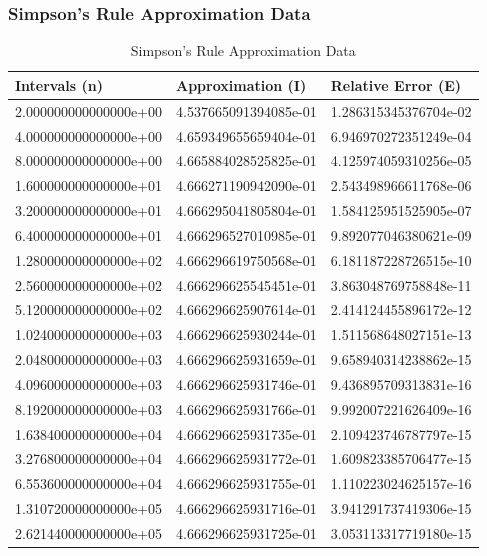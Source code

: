 \documentclass[pdf,color]{UoBnote}
\begin{document}
		\subsubsection{Simpson's Rule Approximation Data}
			\begin{table}[H]
			\centering
			\caption{Simpson's Rule Approximation Data}
    \begin{tabular}{|l|l|l|}
        \hline
		Intervals (n) & Approximation (I) & Relative Error (E)\\
		\hline
        2.000000000000000e+00 & 4.537665091394085e-01 & 1.286315345376704e-02 \\ 
        4.000000000000000e+00 & 4.659349655659404e-01 & 6.946970272351249e-04 \\ 
        8.000000000000000e+00 & 4.665884028525825e-01 & 4.125974059310256e-05 \\ 
        1.600000000000000e+01 & 4.666271190942090e-01 & 2.543498966611768e-06 \\ 
        3.200000000000000e+01 & 4.666295041805804e-01 & 1.584125951525905e-07 \\ 
        6.400000000000000e+01 & 4.666296527010985e-01 & 9.892077046380621e-09 \\ 
        1.280000000000000e+02 & 4.666296619750568e-01 & 6.181187228726515e-10 \\ 
        2.560000000000000e+02 & 4.666296625545451e-01 & 3.863048769758848e-11 \\ 
        5.120000000000000e+02 & 4.666296625907614e-01 & 2.414124455896172e-12 \\ 
        1.024000000000000e+03 & 4.666296625930244e-01 & 1.511568648027151e-13 \\ 
        2.048000000000000e+03 & 4.666296625931659e-01 & 9.658940314238862e-15 \\ 
        4.096000000000000e+03 & 4.666296625931746e-01 & 9.436895709313831e-16 \\ 
        8.192000000000000e+03 & 4.666296625931766e-01 & 9.992007221626409e-16 \\ 
        1.638400000000000e+04 & 4.666296625931735e-01 & 2.109423746787797e-15 \\ 
        3.276800000000000e+04 & 4.666296625931772e-01 & 1.609823385706477e-15 \\ 
        6.553600000000000e+04 & 4.666296625931755e-01 & 1.110223024625157e-16 \\ 
        1.310720000000000e+05 & 4.666296625931716e-01 & 3.941291737419306e-15 \\ 
        2.621440000000000e+05 & 4.666296625931725e-01 & 3.053113317719180e-15 \\ 

\end{tabular}
\end{table}
\end{document}
